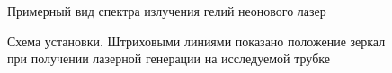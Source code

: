 \documentclass[a4paper,12pt]{article}
\theoremstyle{definition}
\begin{document}
\begin{figure}[H]
	\begin{minipage}[h]{0.3\linewidth}
		\caption{Примерный вид спектра излучения гелий неонового лазер}
	\end{minipage}
	\begin{minipage}[h]{0.7\linewidth}
		\caption{Схема установки. Штриховыми линиями показано положение
		зеркал при получении лазерной генерации на исследуемой трубке}
	\end{minipage}
\end{figure}
\end{document}
